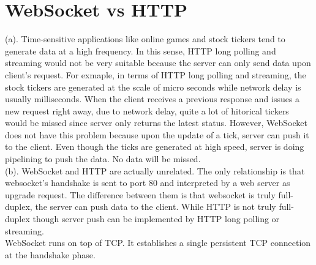 \documentclass[titlepage, paper=a4, fontsize=11pt]{scrartcl} %
\numberwithin{equation}{section} %
\numberwithin{table}{section} %
\begin{document}

\section*{WebSocket vs HTTP}
(a). Time-sensitive applications like online games and stock tickers tend to generate data at a high frequency.
In this sense, HTTP long polling and streaming would not be very suitable because the server can only send data
upon client's request. For exmaple, in terms of HTTP long polling and streaming, the stock tickers are generated at the scale of micro seconds while network delay is usually milliseconds. When the client receives a previous response and issues a new request right away, due to network delay, quite a lot of hitorical tickers would be missed since server only returns the latest status. However, WebSocket does not have this problem because upon the update of a tick, server can push it to the client. Even though the ticks are generated at high speed, server is doing pipelining to push the data. No data will be missed. \\

(b). WebSocket and HTTP are actually unrelated. The only relationship is that websocket's handshake is sent to port 80 and interpreted by a web server as upgrade request. The difference between them is that websocket is truly full-duplex, the server can push data to the client. While HTTP is not truly full-duplex though server push can be implemented by HTTP long polling or streaming. \\

WebSocket runs on top of TCP. It establishes a single persistent TCP connection at the handshake phase.
\\
\end{document}
